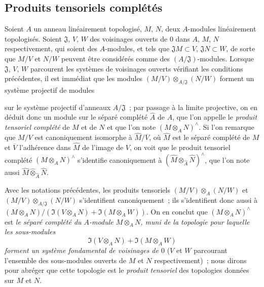 \subsection{Produits tensoriels complétés}
\label{subsection:0.7.7-fr}

\begin{env}[7.7.1]
\label{0.7.7.1-fr}
Soient $A$ un anneau linéairement topologisé, $M$, $N$, deux $A$-modules
linéairement topologisés. Soient $\mathfrak J$, $V$, $W$ des voisinages
ouverts de $0$ dans $A$, $M$, $N$ respectivement, qui soient des
$A$-modules, et tels que $\mathfrak JM\subset V$, $\mathfrak JN\subset W$,
de sorte que $M/V$ et $N/W$ peuvent être considérés comme des
$(A/\mathfrak J)$-modules. Lorsque $\mathfrak J$, $V$, $W$ parcourent les
systèmes de voisinages ouverts vérifiant les conditions précédentes, il est
immédiat que les modules
$(M/V)\otimes_{A/\mathfrak J}(N/W)$ forment un système projectif de modules


sur le système projectif d'anneaux $A/\mathfrak J$~; par passage à la limite
projective, on en déduit donc un module sur le séparé complété $\widehat A$
de $A$, que l'on appelle le \emph{produit tensoriel complété} de $M$ et de
$N$ et que l'on note $(M\otimes_A N)^\wedge$. Si l'on remarque que $M/V$
est canoniquement isomorphe à $\widehat M/\overline V$, où $\widehat M$ est
le séparé complété de $M$ et $\overline V$ l'adhérence dans $\widehat M$ de
l'image de $V$, on voit que le produit tensoriel complété
$(M\otimes_A N)^\wedge$ s'identifie canoniquement à
$(\widehat M\otimes_{\widehat A}\widehat N)^\wedge$, que l'on note aussi
$\widehat M\widehat\otimes_{\widehat A}\widehat N$.
\end{env}

\begin{env}[7.7.2]
\label{0.7.7.2-fr}
\begin{sloppypar}
Avec les notations précédentes, les produits tensoriels
$(M/V)\otimes_A(N/W)$ et
$(M/V)\otimes_{A/\mathfrak J}(N/W)$ s'identifient canoniquement~; ils
s'identifient donc aussi à
$(M\otimes_A N)/(\Im(V\otimes_A N)+\Im(M\otimes_A W))$.
On en conclut que $(M\otimes_A N)^\wedge$ est \emph{le séparé complété du
$A$-module $M\otimes_A N$, muni de la topologie pour laquelle les
sous-modules}
\[
  \Im(V\otimes_A N)+\Im(M\otimes_A W)
\]
\emph{forment un système fondamental de voisinages de $0$} ($V$ et $W$
parcourant l'ensemble des sous-modules ouverts de $M$ et $N$
respectivement)~; nous dirons pour abréger que cette topologie est le
\emph{produit tensoriel} des topologies données sur $M$ et $N$.
\end{sloppypar}
\end{env}


